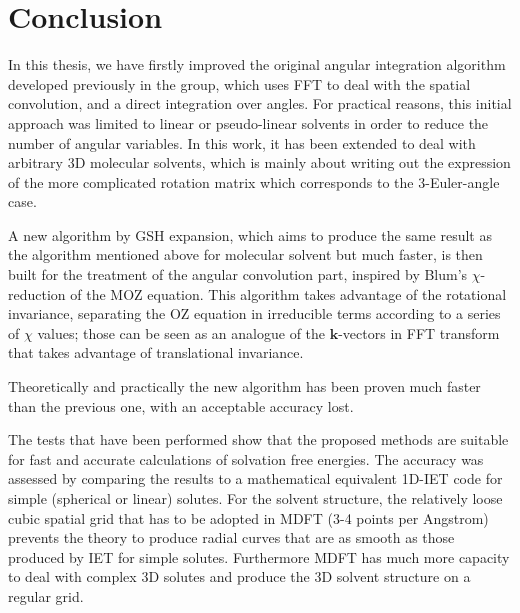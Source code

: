 
\chapter{Conclusion\label{chpt:conclusion}}

In this thesis, we have firstly improved the original angular integration
algorithm developed previously in the group, which uses \acs{FFT}
to deal with the spatial convolution, and a direct integration over
angles. For practical reasons, this initial approach was limited to
linear or pseudo-linear solvents in order to reduce the number of
angular variables. In this work, it has been extended to deal with
arbitrary 3D molecular solvents, which is mainly about writing out
the expression of the more complicated rotation matrix which corresponds
to the 3-Euler-angle case. 

A new algorithm by \acf{GSH} expansion, which aims to produce the
same result as the algorithm mentioned above for molecular solvent
but much faster, is then built for the treatment of the angular convolution
part, inspired by Blum's $\chi$-reduction of the \acs{MOZ} equation.
This algorithm takes advantage of the rotational invariance, separating
the \acs{OZ} equation in irreducible terms according to a series
of $\chi$ values; those can be seen as an analogue of the $\mathbf{k}$-vectors
in \acs{FFT} transform that takes advantage of translational invariance.

Theoretically and practically the new algorithm has been proven much
faster than the previous one, with an acceptable accuracy lost.

The tests that have been performed show that the proposed methods
are suitable for fast and accurate calculations of solvation free
energies. The accuracy was assessed by comparing the results to a
mathematical equivalent 1D-\acf{IET} code for simple (spherical or
linear) solutes. For the solvent structure, the relatively loose cubic
spatial grid that has to be adopted in \acf{MDFT} (3-4 points per
Angstrom) prevents the theory to produce radial curves that are as
smooth as those produced by \acs{IET} for simple solutes. Furthermore
\acf{MDFT} has much more capacity to deal with complex 3D solutes
and produce the 3D solvent structure on a regular grid.

